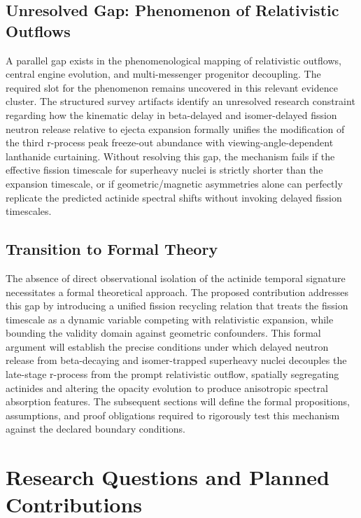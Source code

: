 \documentclass[conference]{IEEEtran}
\begin{document}
\subsection{Unresolved Gap: Phenomenon of Relativistic Outflows}
A parallel gap exists in the phenomenological mapping of relativistic outflows, central engine evolution, and multi-messenger progenitor decoupling. The required slot for the phenomenon remains uncovered in this relevant evidence cluster. The structured survey artifacts identify an unresolved research constraint regarding how the kinematic delay in beta-delayed and isomer-delayed fission neutron release relative to ejecta expansion formally unifies the modification of the third r-process peak freeze-out abundance with viewing-angle-dependent lanthanide curtaining. Without resolving this gap, the mechanism fails if the effective fission timescale for superheavy nuclei is strictly shorter than the expansion timescale, or if geometric/magnetic asymmetries alone can perfectly replicate the predicted actinide spectral shifts without invoking delayed fission timescales.

\subsection{Transition to Formal Theory}
The absence of direct observational isolation of the actinide temporal signature necessitates a formal theoretical approach. The proposed contribution addresses this gap by introducing a unified fission recycling relation that treats the fission timescale as a dynamic variable competing with relativistic expansion, while bounding the validity domain against geometric confounders. This formal argument will establish the precise conditions under which delayed neutron release from beta-decaying and isomer-trapped superheavy nuclei decouples the late-stage r-process from the prompt relativistic outflow, spatially segregating actinides and altering the opacity evolution to produce anisotropic spectral absorption features. The subsequent sections will define the formal propositions, assumptions, and proof obligations required to rigorously test this mechanism against the declared boundary conditions.

\section{Research Questions and Planned Contributions}
\end{document}

